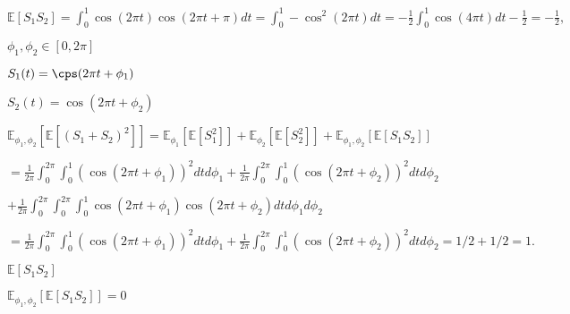 \documentclass{article}
\def\lthtmlcheckvsize{\ifdim\ht\sizebox<\vsize 
  \ifdim\wd\sizebox<\hsize\expandafter\hfill\fi \expandafter\vfill
  \else\expandafter\vss\fi}%
\begin{document}
{\newpage\clearpage
{}%
$\displaystyle \mathbb{E}[S_1S_2] = \int_0^1 \cos(2 \pi t) \cos(2 \pi t + \pi) dt =\int_0^1 -\cos^2(2 \pi t )dt = - \frac{1}{2}\int_0^1 \cos(4 \pi t)dt - \frac{1}{2} = - \frac{1}{2},
$%
\lthtmlindisplaymathZ
\lthtmlcheckvsize\clearpage}

{\newpage\clearpage
{}%
$ \phi_1,\phi_2 \in [0,2 \pi]$%
\lthtmlindisplaymathZ
\lthtmlcheckvsize\clearpage}

{\newpage\clearpage
{}%
$ S_1(t) = \cps(2 \pi t + \phi_1)$%
\lthtmlindisplaymathZ
\lthtmlcheckvsize\clearpage}

{\newpage\clearpage
{}%
$ S_2(t) = \cos(2 \pi t + \phi_2)$%
\lthtmlindisplaymathZ
\lthtmlcheckvsize\clearpage}

{\newpage\clearpage
{}%
$\displaystyle \mathbb{E}_{\phi_1,\phi_2} \left[\mathbb{E}[(S_1 + S_2)^2]\right] = \mathbb{E}_{\phi_1} \left[\mathbb{E}\left[ S_1^2\right]\right] + \mathbb{E}_{\phi_2} \left[\mathbb{E}\left[ S_2^2\right]\right] +\mathbb{E}_{\phi_1,\phi_2} \left[\mathbb{E}\left[ S_1S_2\right]\right]$%
\lthtmlindisplaymathZ
\lthtmlcheckvsize\clearpage}

{\newpage\clearpage
{}%
$\displaystyle =\frac{1}{2 \pi}\int_0^{2 \pi} \int_0^1 (\cos(2 \pi t + \phi_1))^2dt d \phi_1 + \frac{1}{2 \pi}\int_0^{2 \pi} \int_0^1 ( \cos(2 \pi t + \phi_2))^2dt  d \phi_2$%
\lthtmlindisplaymathZ
\lthtmlcheckvsize\clearpage}

{\newpage\clearpage
{}%
$\displaystyle + \frac{1}{2 \pi}\int_0^{2 \pi} \int_0^{2 \pi}\int_0^1 \cos(2 \pi t + \phi_1) \cos(2 \pi t + \phi_2)dt d \phi_1 d \phi_2$%
\lthtmlindisplaymathZ
\lthtmlcheckvsize\clearpage}

{\newpage\clearpage
{}%
$\displaystyle = \frac{1}{2 \pi}\int_0^{2 \pi} \int_0^1 (\cos(2 \pi t + \phi_1))^2dt d \phi_1  + \frac{1}{2 \pi}\int_0^{2 \pi} \int_0^1 ( \cos(2 \pi t + \phi_2))^2dt  d \phi_2 = 1/2 +1/2 =1.$%
\lthtmlindisplaymathZ
\lthtmlcheckvsize\clearpage}

{\newpage\clearpage
{}%
$ \mathbb{E}[S_1 S_2]$%
\lthtmlindisplaymathZ
\lthtmlcheckvsize\clearpage}

{\newpage\clearpage
{}%
$ \mathbb{E}_{\phi_1,\phi_2} \left[\mathbb{E}\left[ S_1S_2\right]\right] =0$%
\lthtmlindisplaymathZ
\lthtmlcheckvsize\clearpage}
\end{document}

